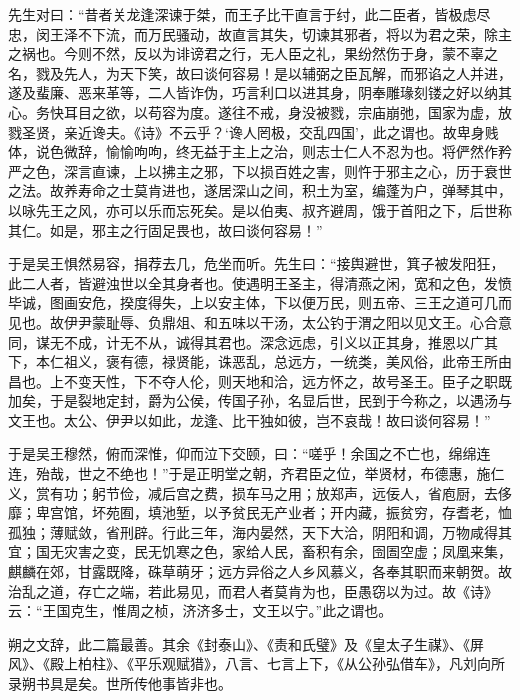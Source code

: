\documentclass[12pt,UTF8]{ctexbook}
\begin{document}
先生对曰：“昔者关龙逢深谏于桀，而王子比干直言于纣，此二臣者，皆极虑尽忠，闵王泽不下流，而万民骚动，故直言其失，切谏其邪者，将以为君之荣，除主之祸也。今则不然，反以为诽谤君之行，无人臣之礼，果纷然伤于身，蒙不辜之名，戮及先人，为天下笑，故曰谈何容易！是以辅弼之臣瓦解，而邪谄之人并进，遂及蜚廉、恶来革等，二人皆诈伪，巧言利口以进其身，阴奉雕瑑刻镂之好以纳其心。务快耳目之欲，以苟容为度。遂往不戒，身没被戮，宗庙崩弛，国家为虚，放戮圣贤，亲近谗夫。《诗》不云乎？‘谗人罔极，交乱四国’，此之谓也。故卑身贱体，说色微辞，愉愉呴呴，终无益于主上之治，则志士仁人不忍为也。将俨然作矜严之色，深言直谏，上以拂主之邪，下以损百姓之害，则忤于邪主之心，历于衰世之法。故养寿命之士莫肯进也，遂居深山之间，积土为室，编蓬为户，弹琴其中，以咏先王之风，亦可以乐而忘死矣。是以伯夷、叔齐避周，饿于首阳之下，后世称其仁。如是，邪主之行固足畏也，故曰谈何容易！”



于是吴王惧然易容，捐荐去几，危坐而听。先生曰：“接舆避世，箕子被发阳狂，此二人者，皆避浊世以全其身者也。使遇明王圣主，得清燕之闲，宽和之色，发愤毕诚，图画安危，揆度得失，上以安主体，下以便万民，则五帝、三王之道可几而见也。故伊尹蒙耻辱、负鼎俎、和五味以干汤，太公钓于渭之阳以见文王。心合意同，谋无不成，计无不从，诚得其君也。深念远虑，引义以正其身，推恩以广其下，本仁祖义，褒有德，禄贤能，诛恶乱，总远方，一统类，美风俗，此帝王所由昌也。上不变天性，下不夺人伦，则天地和洽，远方怀之，故号圣王。臣子之职既加矣，于是裂地定封，爵为公侯，传国子孙，名显后世，民到于今称之，以遇汤与文王也。太公、伊尹以如此，龙逢、比干独如彼，岂不哀哉！故曰谈何容易！”



于是吴王穆然，俯而深惟，仰而泣下交颐，曰：“嗟乎！余国之不亡也，绵绵连连，殆哉，世之不绝也！”于是正明堂之朝，齐君臣之位，举贤材，布德惠，施仁义，赏有功；躬节俭，减后宫之费，损车马之用；放郑声，远佞人，省庖厨，去侈靡；卑宫馆，坏苑囿，填池堑，以予贫民无产业者；开内藏，振贫穷，存耆老，恤孤独；薄赋敛，省刑辟。行此三年，海内晏然，天下大洽，阴阳和调，万物咸得其宜；国无灾害之变，民无饥寒之色，家给人民，畜积有余，囹圄空虚；凤凰来集，麒麟在郊，甘露既降，硃草萌牙；远方异俗之人乡风慕义，各奉其职而来朝贺。故治乱之道，存亡之端，若此易见，而君人者莫肯为也，臣愚窃以为过。故《诗》云：“王国克生，惟周之桢，济济多士，文王以宁。”此之谓也。



朔之文辞，此二篇最善。其余《封泰山》、《责和氏璧》及《皇太子生禖》、《屏风》、《殿上柏柱》、《平乐观赋猎》，八言、七言上下，《从公孙弘借车》，凡刘向所录朔书具是矣。世所传他事皆非也。
\end{document}

